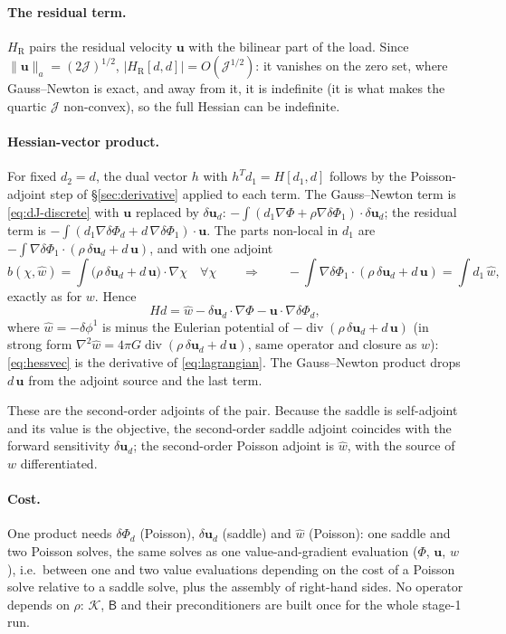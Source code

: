\documentclass[11pt]{article}
\newcommand{\Jf}{\mathscr{J}}  %
\newcommand{\bu}{\mathbf{u}}
\renewcommand{\div}{\operatorname{div}}
\newcommand{\norm}[1]{\lVert #1 \rVert}
\begin{document}
\paragraph{The residual term.} $H_{\mathrm{R}}$ pairs the residual
velocity $\bu$ with the bilinear part of the load. Since
$\norm{\bu}_a = (2\Jf )^{1/2}$, $|H_{\mathrm{R}}[d,d]| = O(\Jf ^{1/2})$: it
vanishes on the zero set, where Gauss--Newton is exact, and away from it,
it is indefinite (it is what makes the quartic $\Jf $ non-convex), so the
full Hessian can be indefinite.

\paragraph{Hessian-vector product.} For fixed $d_2 = d$, the dual vector
$h$ with $h^{T}d_1 = H[d_1,d]$ follows by the Poisson-adjoint step of
\S\ref{sec:derivative} applied to each term. The Gauss--Newton term is
\eqref{eq:dJ-discrete} with $\bu$ replaced by $\delta\bu_d$:
$-\int(d_1\nabla\Phi + \rho\nabla\delta\Phi_1)\cdot\delta\bu_d$; the
residual term is $-\int(d_1\nabla\delta\Phi_d + d\,\nabla\delta\Phi_1)
\cdot\bu$. The parts non-local in $d_1$ are $-\int\nabla\delta\Phi_1\cdot
(\rho\,\delta\bu_d + d\,\bu)$, and with one adjoint
\begin{equation}
  b(\chi,\hat w) = \int\bigl(\rho\,\delta\bu_d + d\,\bu\bigr)\cdot\nabla\chi
  \quad\forall\chi
  \qquad\Longrightarrow\qquad
  -\int\nabla\delta\Phi_1\cdot(\rho\,\delta\bu_d + d\,\bu)
  = \int d_1\,\hat w ,
\end{equation}
exactly as for $w$. Hence
\begin{equation}
  H d = \hat w - \delta\bu_d\cdot\nabla\Phi - \bu\cdot\nabla\delta\Phi_d ,
  \label{eq:hessvec}
\end{equation}
where $\hat w = -\delta\phi^1$ is minus the Eulerian potential of
$-\div(\rho\,\delta\bu_d + d\,\bu)$ (in strong form
$\nabla^2\hat w = 4\pi G\div(\rho\,\delta\bu_d + d\,\bu)$, same operator
and closure as $w$): \eqref{eq:hessvec} is the derivative of
\eqref{eq:lagrangian}. The Gauss--Newton product drops $d\,\bu$ from the
adjoint source and the last term.

These are the second-order adjoints of the pair. Because the saddle is
self-adjoint and its value is the objective, the second-order saddle
adjoint coincides with the forward sensitivity $\delta\bu_d$; the
second-order Poisson adjoint is $\hat w$, with the source of $w$
differentiated.

\paragraph{Cost.} One product needs $\delta\Phi_d$ (Poisson),
$\delta\bu_d$ (saddle) and $\hat w$ (Poisson): one saddle and two Poisson
solves, the same solves as one value-and-gradient evaluation ($\Phi$,
$\bu$, $w$), i.e.\ between one and two value evaluations depending on
the cost of a Poisson solve relative to a saddle solve, plus the
assembly of right-hand sides. No operator depends on $\rho$:
$\mathcal{K}$, $\mathsf{B}$ and their preconditioners are built once for
the whole stage-1 run.
\end{document}
